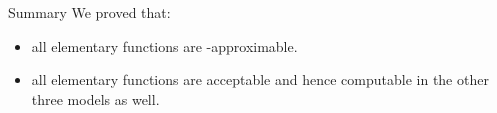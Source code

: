 \begin{frame}{Summary}
    We proved that:
    \pause
    \begin{itemize}
        \item all elementary functions are \WhileCC-approximable.
        \pause \item all elementary functions are acceptable
        \pause and hence computable in the other three models as well.
    \end{itemize}
\end{frame}
